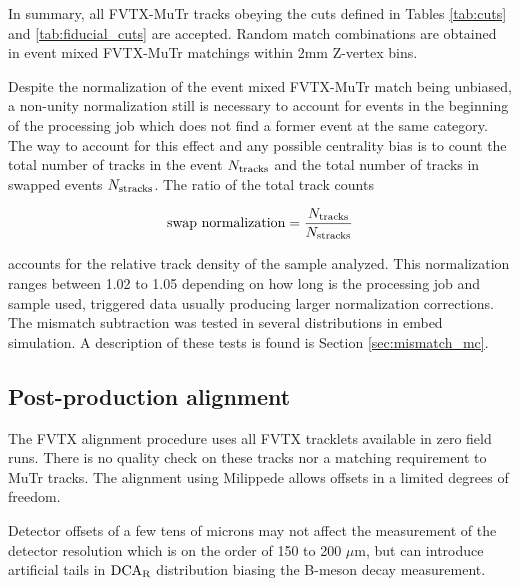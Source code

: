 \documentclass[12pt]{article}
\newcommand{\dcar}{$\rm{DCA}_{R}$ }
\begin{document}
In summary, all  FVTX-MuTr tracks obeying the cuts defined in Tables \ref{tab:cuts} and \ref{tab:fiducial_cuts} are accepted. Random match combinations 
are obtained in event mixed FVTX-MuTr matchings within 2mm Z-vertex bins.

Despite the normalization of the event mixed FVTX-MuTr match being unbiased, a non-unity normalization still is necessary to account for events in the beginning 
of the processing job which does not find a former event at the same category. The way to account for this effect and any possible centrality bias is to count the
 total number of tracks in the event $N_{\rm tracks}$ and the total number of tracks in swapped events $N_{\rm stracks}$. The ratio of the total track counts

\begin{equation}
\label{eq:swap_norm}
   \textrm{swap normalization} = \frac{N_{\rm tracks}}{N_{\rm stracks}}
\end{equation}

\noindent accounts for the relative track density of the sample analyzed. This normalization ranges between 1.02 to 1.05 depending on how long is the processing 
job and sample used,  triggered data usually producing larger normalization corrections. The mismatch subtraction was tested in several distributions in embed simulation. A description of these tests is found is Section \ref{sec:mismatch_mc}.

\pagebreak
\newpage


\subsection{Post-production alignment}
\label{sec:postprod_alignment}

The FVTX alignment procedure uses all FVTX tracklets available in zero field runs. There is no quality check on these tracks nor a matching requirement to MuTr tracks. 
The alignment using Milippede allows offsets in a limited degrees of freedom.

Detector offsets of a few tens of microns may not affect the measurement of the detector resolution which is on the order of 150 to 200 $\mu$m, 
but can introduce artificial tails in \dcar distribution biasing the B-meson decay measurement. 
\end{document}
